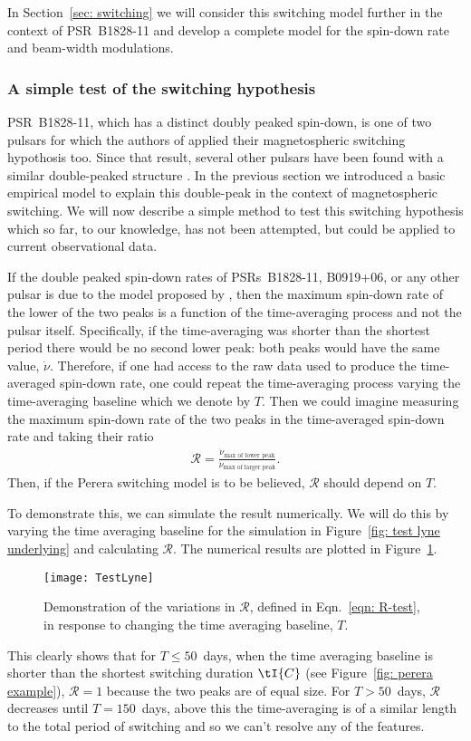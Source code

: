 In Section~\ref{sec: switching} we will consider this switching
model further in the context of PSR~B1828-11 and develop a complete model for the
spin-down rate and beam-width modulations.

\subsubsection{A simple test of the switching hypothesis}
\label{sec: switching predictions}
PSR~B1828-11, which has a distinct doubly peaked spin-down, is one of two
pulsars for which the authors of \citet{Lyne2010} applied their magnetospheric
switching hypothosis too. Since
that result, several other pulsars have been found with a similar double-peaked
structure \citep{Perera2014, Perera2016}. In the previous section we introduced
a basic empirical model to explain this double-peak in the context of
magnetospheric switching. We will now describe a simple method to test this
switching hypothesis which so far, to our knowledge, has not been attempted,
but could be applied to current observational data.

If the double peaked spin-down rates of PSRs~B1828-11, B0919+06, or any other pulsar
is due to the model proposed by \citet{Perera2014}, then the maximum spin-down rate
of the lower of the two peaks is a function of the time-averaging process and not
the pulsar itself.  Specifically, if the time-averaging was shorter than the
shortest period there would be no second lower peak: both peaks would have the same
value, $\dot{\nu}$.  Therefore, if one had access to the raw data used to
produce the time-averaged spin-down rate, one could repeat the time-averaging
process varying the time-averaging baseline which we denote by $T$. Then we
could imagine measuring the maximum spin-down rate of the two peaks in the
time-averaged spin-down rate and taking their ratio
\begin{align}
\mathcal{R} = \frac{\dot{\nu}_\textrm{max of lower peak}}
                   {\dot{\nu}_\textrm{max of larger peak}}.
\label{eqn: R-test}
\end{align}
Then, if the Perera switching model is to be believed, $\mathcal{R}$ should depend on $T$.

To demonstrate this, we can simulate the result numerically. We will do this by
varying the time averaging baseline for the simulation in Figure~\ref{fig: test
lyne underlying} and calculating $\mathcal{R}$. The numerical results are
plotted in Figure~\ref{fig: test lyne}.
\begin{figure}[htb]
    \centering
    \texttt{[image: TestLyne]}
    \caption{Demonstration of the variations in $\mathcal{R}$, defined in
             Eqn.~\eqref{eqn: R-test}, in response to changing the time averaging
             baseline, $T$.}
    \label{fig: test lyne}
\end{figure}
This clearly shows that for $T\le50$~days, when the time averaging baseline is
shorter than the shortest switching duration $\tI{C}$ (see Figure~\ref{fig:
perera example}), $\mathcal{R}=1$ because the two peaks are of equal size.  For
$T>50$~days, $\mathcal{R}$ decreases until $T=150$~days, above this the
time-averaging is of a similar length to the total period of switching and so
we can't resolve any of the features.

